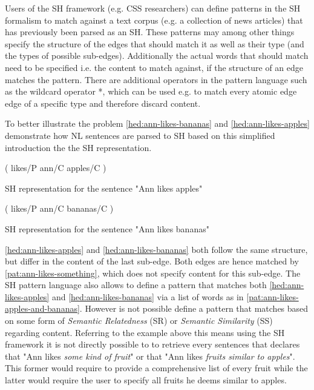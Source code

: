 \documentclass[11pt]{scrreprt}
\let\cite\parencite  %
\begin{document}
Users of the SH framework (e.g. CSS researchers) can define patterns in the SH formalism to match against a text corpus (e.g. a collection of news articles) that has previously been parsed as an SH. These patterns may among other things specify the structure of the edges that should match it as well as their type (and the types of possible sub-edges). Additionally the actual words that should match need to be specified i.e. the content to match against, if the structure of an edge matches the pattern. 
There are additional operators in the pattern language such as the wildcard operator \textsf{*}, which can be used e.g. to match every atomic edge edge of a specific type and therefore discard content.

To better illustrate the problem \cref{hed:ann-likes-bananas} and \cref{hed:ann-likes-apples} demonstrate how NL sentences are parsed to SH based on this simplified introduction the the SH representation.

\begin{hedge}
  \normalfont\sffamily
  \centering
  ( likes/P ann/C apples/C ) 
  \caption{SH representation for the sentence "Ann likes apples"}
  \label{hed:ann-likes-apples}
\end{hedge}

\begin{hedge}
  \normalfont\sffamily
  \centering
  ( likes/P ann/C bananas/C ) 
  \caption{SH representation for the sentence "Ann likes bananas"}
  \label{hed:ann-likes-bananas}
\end{hedge}


\cref{hed:ann-likes-apples} and \cref{hed:ann-likes-bananas} both follow the same structure, but differ in the content of the last sub-edge. Both edges are hence matched by \cref{pat:ann-likes-something}, which does not specify content for this sub-edge.
The SH pattern language also allows to define a pattern that matches both \cref{hed:ann-likes-apples} and \cref{hed:ann-likes-bananas} via a list of words as in \cref{pat:ann-likes-apples-and-bananas}. However is not possible define a pattern that matches based on some form of \textit{Semantic Relatedness} (SR) or \textit{Semantic Similarity} (SS) \cite{harispeSemanticSimilarityNatural2015} regarding content.
Referring to the example above this means using the SH framework it is not directly possible to to retrieve every sentences that declares that "Ann likes \textit{some kind of fruit}" or that "Ann likes \textit{fruits similar to apples}". This former would require to provide a comprehensive list of every fruit while the latter would require the user to specify all fruits he deems similar to apples.
\end{document}

